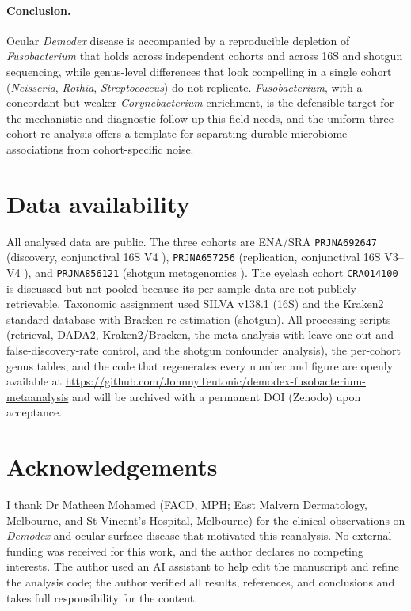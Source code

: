 \documentclass[11pt]{article}
\newcommand{\demodex}{\textit{Demodex}}
\begin{document}
\paragraph{Conclusion.} Ocular \demodex{} disease is accompanied by a reproducible
depletion of \textit{Fusobacterium} that holds across independent cohorts and
across 16S and shotgun sequencing, while genus-level differences that
look compelling in a single cohort (\textit{Neisseria}, \textit{Rothia},
\textit{Streptococcus}) do not replicate. \textit{Fusobacterium}, with a concordant but weaker
\textit{Corynebacterium} enrichment, is the defensible target for the mechanistic
and diagnostic follow-up this field needs, and the uniform three-cohort
re-analysis offers a template for separating durable microbiome associations from
cohort-specific noise.

\section*{Data availability}
All analysed data are public. The three cohorts are ENA/SRA \texttt{PRJNA692647}
(discovery, conjunctival 16S V4 \citep{liang2021}), \texttt{PRJNA657256}
(replication, conjunctival 16S V3--V4 \citep{yan2020}), and \texttt{PRJNA856121}
(shotgun metagenomics \citep{fu2022}). The eyelash cohort \texttt{CRA014100}
\citep{zou2024} is discussed but not pooled because its per-sample data are not
publicly retrievable. Taxonomic assignment used SILVA v138.1 \citep{quast2013}
(16S) and the Kraken2 standard database \citep{kraken2} with Bracken re-estimation
\citep{bracken} (shotgun). All processing scripts (retrieval, DADA2, Kraken2/Bracken,
the meta-analysis with leave-one-out and false-discovery-rate control, and the
shotgun confounder analysis), the per-cohort genus tables, and the code that
regenerates every number and figure are openly available at
\url{https://github.com/JohnnyTeutonic/demodex-fusobacterium-metaanalysis} and will
be archived with a permanent DOI (Zenodo) upon acceptance.

\section*{Acknowledgements}
I thank Dr Matheen Mohamed (FACD, MPH; East Malvern Dermatology, Melbourne, and
St Vincent's Hospital, Melbourne) for the clinical observations on \demodex{} and
ocular-surface disease that motivated this reanalysis. No external funding was
received for this work, and the author declares no competing interests. The author
used an AI assistant to help edit the manuscript and refine the analysis code; the
author verified all results, references, and conclusions and takes full
responsibility for the content.
\end{document}
